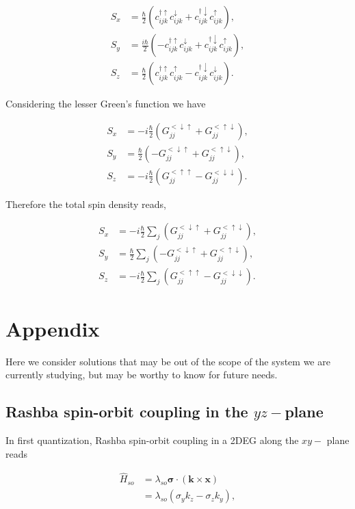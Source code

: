 \documentclass[10pt,prb,showpacs,amssymb,floatfix]{revtex4-1}
\newcommand{\dg}{\dagger}
\newcommand{\dna}{\downarrow}
\newcommand{\nn}{\nonumber}
\newcommand{\upa}{\uparrow}
\newcommand{\lam}{\lambda}
\newcommand{\sg}{\sigma}
\begin{document}
\begin{align}
S_x &= \frac{\hbar}{2} (c_{ijk}^{\dg\upa} c_{ijk}^{\dna} + c_{ijk}^{\dg\dna} c_{ijk}^{\upa}), \\
S_y &= \frac{i\hbar}{2} (-c_{ijk}^{\dg\upa} c_{ijk}^{\dna} + c_{ijk}^{\dg\dna} c_{ijk}^{\upa}), \\
S_z &= \frac{\hbar}{2} (c_{ijk}^{\dg\upa} c_{ijk}^{\upa} - c_{ijk}^{\dg\dna} c_{ijk}^{\dna}).
\end{align}

Considering the lesser Green's function we have

\begin{align}
S_x &= -i\frac{\hbar}{2} (G_{jj}^{< \dna \upa} + G_{jj}^{< \upa \dna} ), \\
S_y &= \frac{\hbar}{2} (-G_{jj}^{< \dna \upa} + G_{jj}^{< \upa \dna}), \\
S_z &= -i\frac{\hbar}{2} (G_{jj}^{< \upa \upa} - G_{jj}^{< \dna \dna}).
\end{align}

Therefore the total spin density reads,

\begin{align}
S_x &= -i\frac{\hbar}{2} \sum_j(G_{jj}^{< \dna \upa} + G_{jj}^{< \upa \dna} ), \\
S_y &= \frac{\hbar}{2} \sum_j(-G_{jj}^{< \dna \upa} + G_{jj}^{< \upa \dna}), \\
S_z &= -i\frac{\hbar}{2} \sum_j(G_{jj}^{< \upa \upa} - G_{jj}^{< \dna \dna}).
\end{align}



\section{Appendix}

Here we consider solutions that may be out of the scope of the system we are currently studying, but may be worthy to know for future needs.
\subsection{Rashba spin-orbit coupling in the $yz-$plane}

In first quantization, Rashba spin-orbit coupling in a 2DEG along the $xy-$ plane reads 

\begin{align}
\hat H_{so} &= \lam_{so} \bm \sg \cdot (\bm k \times \bm x) \nn\\
&=\lambda_{so} (\sigma_y k_z - \sigma_z k_y),
\label{alpxyyz}
\end{align}
\end{document}
